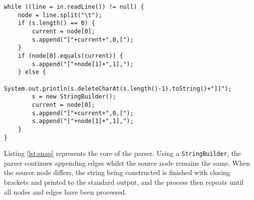 \begin{lstlisting}[float]
while ((line = in.readLine()) != null) {
	node = line.split("\t");
	if (s.length() == 0) {
		current = node[0];
		s.append("["+current+",0,[");
	}
	if (node[0].equals(current)) {
		s.append("["+node[1]+",1],");
	} else {
		System.out.println(s.deleteCharAt(s.length()-1).toString()+"]]");
		s = new StringBuilder();
		current = node[0];
		s.append("["+current+",0,[");
		s.append("["+node[1]+",1],");
	}
}
\end{lstlisting}

Listing \ref{lst:snap} represents the core of the parser. Using a \verb/StringBuilder/, the parser continues appending edges whilst the source node remains the same. When the source node differs, the string being constructed is finished with closing brackets and printed to the standard output, and the process then repeats until all nodes and edges have been processed.